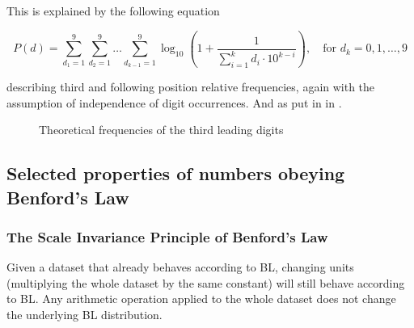 This is explained by the following equation 

\begin{equation}
    P(d) = \sum\limits_{d_1=1}^{9} \sum\limits_{d_2=1}^{9} \dots \sum\limits_{d_{k-1}=1}^{9}   \log_{10}\left( 1+\frac{1}{\sum\limits_{i=1}^{k} d_i \cdot 10^{k-i} }\right), \quad \text{for } d_k = 0,1,\dots,9 
\end{equation}

describing third and following position relative frequencies, again with the assumption of independence of digit occurrences. And  as put in \citeauthor{Hronova2023} in \citeyear{Hronova2023}. 

\begin{figure}[ht]
    \centering
    \caption{Theoretical frequencies of the third leading digits}  
    \label{fig:third-digit-law}
    \pgfplotsset{width=8.5cm,compat=1.18}
\end{figure}

\subsection{Selected properties of numbers obeying Benford's Law}

\subsubsection{The Scale Invariance Principle of Benford's Law}

Given a dataset that already behaves according to BL, changing units (multiplying the whole dataset by the same constant) will still behave according to BL. Any arithmetic operation applied to the whole dataset does not change the underlying BL distribution. \cite{kossovsky2014benford, Hronova2023} %

